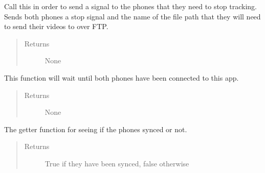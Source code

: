 \documentclass[letterpaper,10pt,english]{sphinxmanual}
\begin{document}
\begin{fulllineitems}

\begin{fulllineitems}
\label{\detokenize{index:src.Controllers.PhoneController.PhoneControl.stopRecording}}
Call this in order to send a signal to the phones that they need to stop tracking. Sends both
phones a stop signal and the name of the file path that they will need to send their
videos to over FTP.
\begin{quote}\begin{description}
\item[{Returns}] \leavevmode
None

\end{description}\end{quote}

\end{fulllineitems}


\begin{fulllineitems}
\label{\detokenize{index:src.Controllers.PhoneController.PhoneControl.sync}}
This function will wait until both phones have been connected to this app.
\begin{quote}\begin{description}
\item[{Returns}] \leavevmode
None

\end{description}\end{quote}

\end{fulllineitems}


\begin{fulllineitems}
\label{\detokenize{index:src.Controllers.PhoneController.PhoneControl.synced}}
The getter function for seeing if the phones synced or not.
\begin{quote}\begin{description}
\item[{Returns}] \leavevmode
True if they have been synced, false otherwise


\end{description}
\end{quote}
\end{fulllineitems}
\end{fulllineitems}
\end{document}
